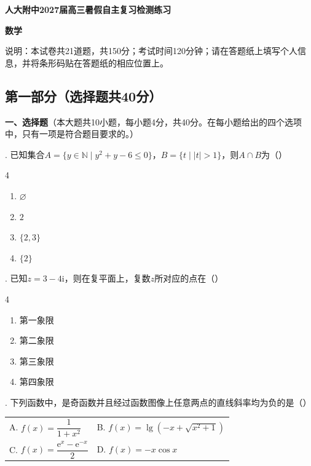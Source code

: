 \pagestyle{plain}

\begin{center}
  {\Large\bfseries 人大附中2027届高三暑假自主复习检测练习\par}
  \vspace{0.5em}
  {\Large\bfseries 数\quad 学}
\end{center}

\noindent 说明：本试卷共21道题，共150分；考试时间120分钟；请在答题纸上填写个人信息，并将条形码贴在答题纸的相应位置上。

\subsection*{第一部分（选择题\quad 共40分）}

\noindent\textbf{一、选择题}（本大题共10小题，每小题4分，共40分。在每小题给出的四个选项中，只有一项是符合题目要求的。）

. 已知集合$A=\{y\in\mathbb{N}\mid y^2+y-6\leqslant0\}$，$B=\{t\mid |t|>1\}$，则$A\cap B$为（\quad）
\begin{multicols}{4}
\begin{enumerate}[label=\Alph*.,leftmargin=*]
  \item $\varnothing$
  \item $2$
  \item $\{2,3\}$
  \item $\{2\}$
\end{enumerate}
\end{multicols}

. 已知$z=3-4\mathrm{i}$，则在复平面上，复数$z$所对应的点在（\quad）
\begin{multicols}{4}
\begin{enumerate}[label=\Alph*.,leftmargin=*]
  \item 第一象限
  \item 第二象限
  \item 第三象限
  \item 第四象限
\end{enumerate}
\end{multicols}

. 下列函数中，是奇函数并且经过函数图像上任意两点的直线斜率均为负的是（\quad）
\begin{center}
\begin{tabular}{@{}p{}p{}@{}}
A. $f(x)=\dfrac{1}{1+x^2}$
  & B. $f(x)=\lg\!\left(-x+\sqrt{x^2+1}\right)$ \\
C. $f(x)=\dfrac{\mathrm{e}^x-\mathrm{e}^{-x}}{2}$
  & D. $f(x)=-x\cos x$
\end{tabular}
\end{center}

